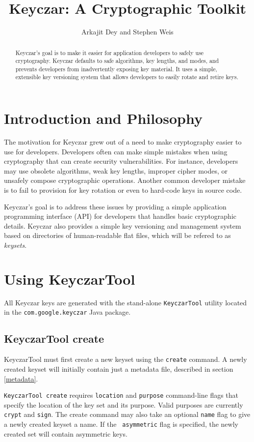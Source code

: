 \documentclass{llncs}
\title{Keyczar: A Cryptographic Toolkit}
\author{Arkajit Dey\inst{1} and Stephen Weis\inst{2}}
\institute{Stanford University, Stanford, CA, USA 94305
\and
Google Inc., Mountain View, CA, USA 94043}
\begin{document}
\maketitle

\begin{abstract}
Keyczar's goal is to make it easier for application developers to safely use
cryptography. Keyczar defaults to safe algorithms, key lengths, and
modes, and prevents developers from inadvertently exposing key material. It
uses a simple, extensible key versioning system that allows developers to
easily rotate and retire keys. 
\end{abstract}

\section{Introduction and Philosophy}

The motivation for Keyczar grew out of a need to make cryptography easier to
use for developers. Developers often can make simple mistakes when using
cryptography that can create security vulnerabilities. For instance, developers
may use obsolete algorithms, weak key lengths, improper cipher modes, or
unsafely compose cryptographic operations. Another common developer mistake is
to fail to provision for key rotation or even to hard-code keys in source
code.

Keyczar's goal is to address these issues by providing a simple application
programming interface (API) for developers that handles basic cryptographic
details. Keyczar also provides a simple key versioning and management system
based on directories of human-readable flat files, which will be refered to as
{\it keysets}. 
\section{Using KeyczarTool}

All Keyczar keys are generated with the stand-alone
{\tt KeyczarTool} utility located in the {\tt com.google.keyczar} Java package.

\subsection{KeyczarTool create}
KeyczarTool must first create a new keyset using the {\tt create} command. A
newly created keyset will initially contain just a metadata file, described in
section \ref{metadata}.

{\tt KeyczarTool create} requires {\tt location} and {\tt purpose} command-line
flags that specify the location of the key set and its purpose. Valid purposes
are currently {\tt crypt} and {\tt sign}. The create command may also take
an optional {\tt name} flag to give a newly created keyset a name. If the {\tt
asymmetric} flag is specified, the newly created set will contain asymmetric
keys.
\end{document}
